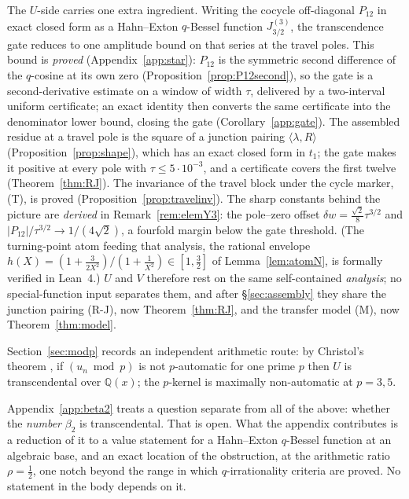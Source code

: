 \documentclass[11pt]{article}
\theoremstyle{plain}
\theoremstyle{definition}
\theoremstyle{remark}
\newcommand{\Q}{\mathbb{Q}}
\begin{document}
The $U$-side carries one extra ingredient. Writing the cocycle off-diagonal $P_{12}$ in exact
closed form as a Hahn--Exton $q$-Bessel function $J^{(3)}_{3/2}$, the transcendence gate reduces to
one amplitude bound on that series at the travel poles. This bound is \emph{proved}
(Appendix~\ref{app:star}): $P_{12}$ is the symmetric second difference of the $q$-cosine at its own
zero (Proposition~\ref{prop:P12second}), so the gate is a second-derivative estimate on a window of
width $\tau$, delivered by a two-interval uniform certificate; an exact identity then converts the
same certificate into the denominator lower bound, closing the gate
(Corollary~\ref{app:gate}). The assembled residue at a travel pole is the square of a junction
pairing $\langle\lambda,R\rangle$ (Proposition~\ref{prop:shape}), which has an exact closed form in
$t_1$; the gate makes it positive at every pole with $\tau\le5\cdot10^{-3}$, and a certificate covers
the first twelve (Theorem~\ref{thm:RJ}). The invariance of the travel block under the cycle marker,
\textup{(T)}, is proved (Proposition~\ref{prop:travelinv}). The sharp constants behind the picture are \emph{derived} in
Remark~\ref{rem:elemY3}: the pole--zero offset $\delta w=\tfrac{\sqrt2}8\tau^{3/2}$ and
$|P_{12}|/\tau^{3/2}\to1/(4\sqrt2)$, a fourfold margin below the gate threshold. (The
turning-point atom feeding that analysis, the rational envelope
$h(X)=(1+\tfrac3{2X^2})/(1+\tfrac1{X^2})\in[1,\tfrac32]$ of Lemma~\ref{lem:atomN}, is formally
verified in Lean~4.) $U$ and $V$ therefore rest on the same self-contained \emph{analysis}; no
special-function input separates them, and after \S\ref{sec:assembly} they share the junction
pairing \textup{(R-J)}, now Theorem~\ref{thm:RJ}, and the transfer model \textup{(M)}, now
Theorem~\ref{thm:model}.

Section~\ref{sec:modp} records an independent arithmetic route: by Christol's theorem
\cite{Christol1979,CKMR1980}, if
$(u_n\bmod p)$ is not $p$-automatic for one prime $p$ then $U$ is transcendental over $\Q(x)$; the
$p$-kernel is maximally non-automatic at $p=3,5$.

Appendix~\ref{app:beta2} treats a question separate from all of the above: whether the \emph{number}
$\beta_2$ is transcendental. That is open. What the appendix contributes is a reduction of it to a
value statement for a Hahn--Exton $q$-Bessel function at an algebraic base, and an exact location of
the obstruction, at the arithmetic ratio $\rho=\tfrac12$, one notch beyond the range in which
$q$-irrationality criteria are proved. No statement in the body depends on it.
\end{document}
